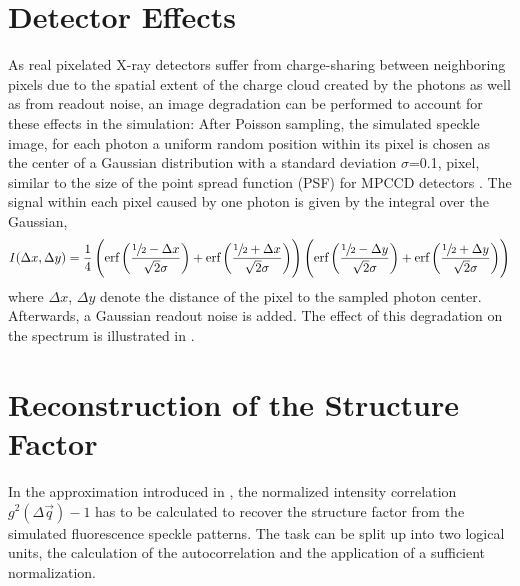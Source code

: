 \section{Detector Effects}
\label{sec:chargesharing}
As real pixelated X-ray detectors suffer from charge-sharing between neighboring pixels due to the spatial extent of the charge cloud created by the photons as well as from readout noise, an image degradation can be performed to account for these effects in the simulation: After Poisson sampling, the simulated speckle image, for each photon a uniform random position within its pixel is chosen as the center of a Gaussian distribution with a  standard deviation $\sigma$=0.1, pixel, similar to the size of the point spread function (PSF) for MPCCD detectors \cite{mpccd}.
The signal within each pixel caused by one photon is given by the integral over the Gaussian,
\begin{equation*}
	I(\Delta x,\Delta y)=\frac{1}{4} \left(\text{erf}\left(\frac{\sfrac{1}{2}-\Delta x}{\sqrt{2}
		\sigma}\right)+\text{erf}\left(\frac{\sfrac{1}{2}+\Delta x}{\sqrt{2} \sigma}\right)\right) \left(\text{erf}\left(\frac{\sfrac{1}{2}-\Delta y}{\sqrt{2}
		\sigma}\right)+\text{erf}\left(\frac{\sfrac{1}{2}+\Delta y}{\sqrt{2} \sigma}\right)\right)
\end{equation*}
where $\Delta x$, $\Delta y$ denote the distance of the pixel to the sampled photon center. Afterwards, a Gaussian readout noise is added. The effect of this degradation on the spectrum is illustrated in .

\section{Reconstruction of the Structure Factor}
In the approximation introduced in , the normalized intensity correlation $g^2(\Delta\vec{q})-1$ has to be calculated to recover the structure factor from the simulated fluorescence speckle patterns. The task can be split up into two logical units, the calculation of the autocorrelation and the application of a sufficient normalization.

